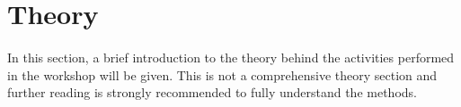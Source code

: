 \section{Theory}
    \paragraph{}
    In this section, a brief introduction to the theory behind the activities performed in the workshop will be given. This is not a comprehensive theory section and further reading is strongly recommended to fully understand the methods.






